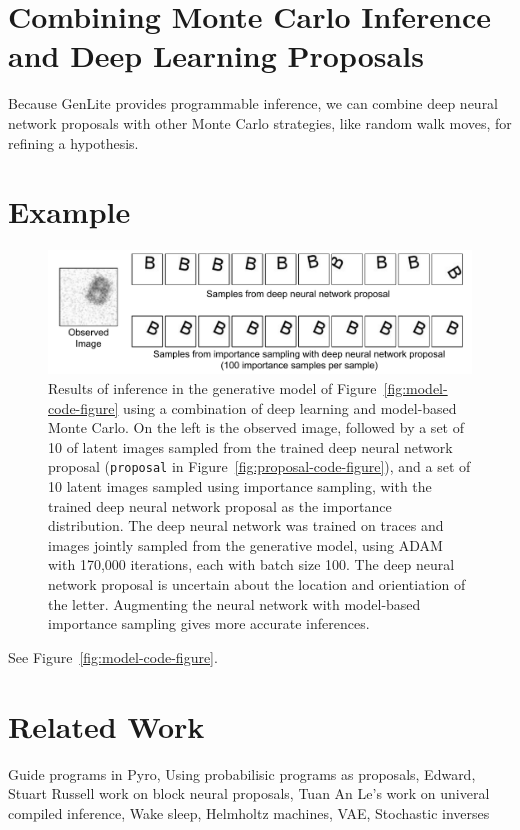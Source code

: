 \documentclass{article}
\begin{document}
\section{Combining Monte Carlo Inference and Deep Learning Proposals}
Because GenLite provides programmable inference, we can combine deep neural network proposals with other Monte Carlo strategies, like random walk moves, for refining a hypothesis.






\section{Example}

\begin{figure}[h]
\centering
    \includegraphics[width=1.0\textwidth]{images/deep-neural-network-is.pdf}
    \caption{
Results of inference in the generative model of Figure~\ref{fig:model-code-figure} using a combination of deep learning and model-based Monte Carlo.
On the left is the observed image, followed by a set of 10 of latent images sampled from the trained deep neural network proposal (\texttt{proposal} in Figure~\ref{fig:proposal-code-figure}), and a set of 10 latent images sampled using importance sampling, with the trained deep neural network proposal as the importance distribution.
The deep neural network was trained on traces and images jointly sampled from the generative model, using ADAM with 170,000 iterations, each with batch size 100.
The deep neural network proposal is uncertain about the location and orientiation of the letter.
Augmenting the neural network with model-based importance sampling gives more accurate inferences.
}
    \label{fig:example-results}
\end{figure}

See Figure~\ref{fig:model-code-figure}.


\section{Related Work}
Guide programs in Pyro,
Using probabilisic programs as proposals,
Edward,
Stuart Russell work on block neural proposals,
Tuan An Le's work on univeral compiled inference,
Wake sleep,
Helmholtz machines,
VAE,
Stochastic inverses
\end{document}
